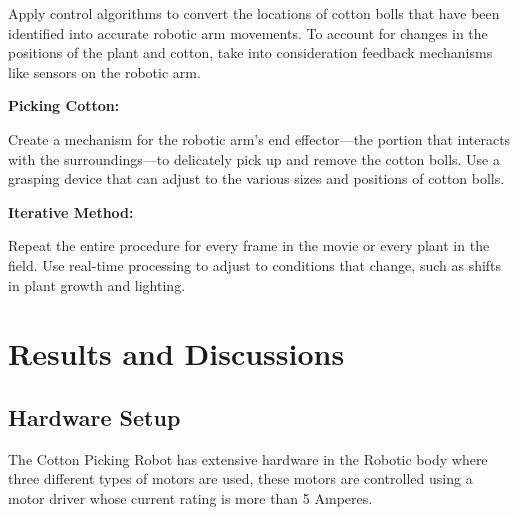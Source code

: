 \documentclass[12pt,a4paper]{report}
\begin{document}
Apply control algorithms to convert the locations of cotton bolls that have been identified into accurate robotic arm movements.
To account for changes in the positions of the plant and cotton, take into consideration feedback mechanisms like sensors on the robotic arm.

\par {\bf{Picking Cotton:}}

Create a mechanism for the robotic arm's end effector—the portion that interacts with the surroundings—to delicately pick up and remove the cotton bolls.
Use a grasping device that can adjust to the various sizes and positions of cotton bolls.

 {\bf{Iterative Method:}}

Repeat the entire procedure for every frame in the movie or every plant in the field.
Use real-time processing to adjust to conditions that change, such as shifts in plant growth and lighting.





\chapter{Results and Discussions}




\section {Hardware Setup}

\par The Cotton Picking Robot has extensive hardware in the Robotic body where three different types of motors are used, these motors are controlled using a motor driver whose current rating is more than 5 Amperes.
\end{document}
